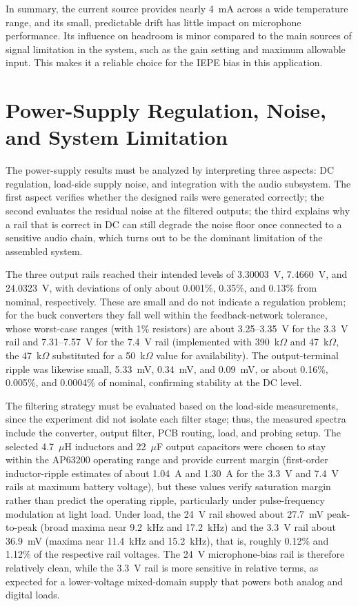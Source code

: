 In summary, the current source provides nearly 4~mA across a wide temperature range, and its small, predictable drift has little impact on microphone performance. Its influence on headroom is minor compared to the main sources of signal limitation in the system, such as the gain setting and maximum allowable input. This makes it a reliable choice for the IEPE bias in this application.

\section{Power-Supply Regulation, Noise, and System Limitation}
\label{sec:power_supply_noise}
The power-supply results must be analyzed by interpreting three aspects: DC regulation, load-side supply noise, and integration with the audio subsystem. The first aspect verifies whether the designed rails were generated correctly; the second evaluates the residual noise at the filtered outputs; the third explains why a rail that is correct in DC can still degrade the noise floor once connected to a sensitive audio chain, which turns out to be the dominant limitation of the assembled system.

The three output rails reached their intended levels of 3.30003~V, 7.4660~V, and 24.0323~V, with deviations of only about 0.001\%, 0.35\%, and 0.13\% from nominal, respectively. These are small and do not indicate a regulation problem; for the buck converters they fall well within the feedback-network tolerance, whose worst-case ranges (with 1\% resistors) are about 3.25--3.35~V for the 3.3~V rail and 7.31--7.57~V for the 7.4~V rail (implemented with 390~k$\Omega$ and 47~k$\Omega$, the 47~k$\Omega$ substituted for a 50~k$\Omega$ value for availability). The output-terminal ripple was likewise small, 5.33~mV, 0.34~mV, and 0.09~mV, or about 0.16\%, 0.005\%, and 0.0004\% of nominal, confirming stability at the DC level.

The filtering strategy must be evaluated based on the load-side measurements, since the experiment did not isolate each filter stage; thus, the measured spectra include the converter, output filter, PCB routing, load, and probing setup. The selected 4.7~$\mu$H inductors and 22~$\mu$F output capacitors were chosen to stay within the AP63200 operating range and provide current margin (first-order inductor-ripple estimates of about 1.04~A and 1.30~A for the 3.3~V and 7.4~V rails at maximum battery voltage), but these values verify saturation margin rather than predict the operating ripple, particularly under pulse-frequency modulation at light load. Under load, the 24~V rail showed about 27.7~mV peak-to-peak (broad maxima near 9.2~kHz and 17.2~kHz) and the 3.3~V rail about 36.9~mV (maxima near 11.4~kHz and 15.2~kHz), that is, roughly 0.12\% and 1.12\% of the respective rail voltages. The 24~V microphone-bias rail is therefore relatively clean, while the 3.3~V rail is more sensitive in relative terms, as expected for a lower-voltage mixed-domain supply that powers both analog and digital loads.

